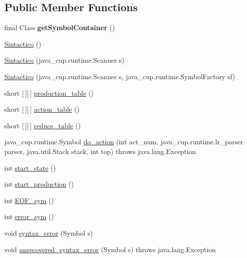 \subsection*{Public Member Functions}
\begin{DoxyCompactItemize}
\item 
\mbox{\label{classanalizadores_1_1_sintactico_a671b368004366987a48baa73395922e9}} 
final Class {\bfseries get\+Symbol\+Container} ()
\item 
\mbox{\hyperlink{classanalizadores_1_1_sintactico_ab295e6867e9b03abb7a57ddafebbe17f}{Sintactico}} ()
\item 
\mbox{\hyperlink{classanalizadores_1_1_sintactico_a63738da7ca20a8b766a502b495de2d8e}{Sintactico}} (java\+\_\+cup.\+runtime.\+Scanner s)
\item 
\mbox{\hyperlink{classanalizadores_1_1_sintactico_a8c8242e3fad56503a7660fc6357e24be}{Sintactico}} (java\+\_\+cup.\+runtime.\+Scanner s, java\+\_\+cup.\+runtime.\+Symbol\+Factory sf)
\item 
short \mbox{[}$\,$\mbox{]}\mbox{[}$\,$\mbox{]} \mbox{\hyperlink{classanalizadores_1_1_sintactico_af13ccb2e45c2aa9ee26199554287de22}{production\+\_\+table}} ()
\item 
short \mbox{[}$\,$\mbox{]}\mbox{[}$\,$\mbox{]} \mbox{\hyperlink{classanalizadores_1_1_sintactico_a724ce0f5fa05d3b5d0f8e76ad5147291}{action\+\_\+table}} ()
\item 
short \mbox{[}$\,$\mbox{]}\mbox{[}$\,$\mbox{]} \mbox{\hyperlink{classanalizadores_1_1_sintactico_ab7348bf43511bec56d16c3175978e430}{reduce\+\_\+table}} ()
\item 
java\+\_\+cup.\+runtime.\+Symbol \mbox{\hyperlink{classanalizadores_1_1_sintactico_a9ea61235703a2be2386a93bda9080615}{do\+\_\+action}} (int act\+\_\+num, java\+\_\+cup.\+runtime.\+lr\+\_\+parser parser, java.\+util.\+Stack stack, int top)  throws java.\+lang.\+Exception   
\item 
int \mbox{\hyperlink{classanalizadores_1_1_sintactico_ad915f32968af0be180255e9625f3e7d9}{start\+\_\+state}} ()
\item 
int \mbox{\hyperlink{classanalizadores_1_1_sintactico_aaef47009be0140b095a5f5a0a870cf7e}{start\+\_\+production}} ()
\item 
int \mbox{\hyperlink{classanalizadores_1_1_sintactico_a7a83735fb9a0ab07d70ada5f59a38be3}{E\+O\+F\+\_\+sym}} ()
\item 
int \mbox{\hyperlink{classanalizadores_1_1_sintactico_a37c5e2a2d218a76d6126a744e30808ac}{error\+\_\+sym}} ()
\item 
void \mbox{\hyperlink{classanalizadores_1_1_sintactico_a56ace143dc3b8419ad93e4f49e43bbf4}{syntax\+\_\+error}} (Symbol s)
\item 
void \mbox{\hyperlink{classanalizadores_1_1_sintactico_a46581bb7792311a4a08c08649fe185ce}{unrecovered\+\_\+syntax\+\_\+error}} (Symbol s)  throws java.\+lang.\+Exception
\end{DoxyCompactItemize}
